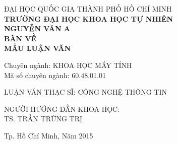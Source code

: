\vspace{-0.75cm}
\begin{center}
\begingroup \fontsize{14pt}{0pt}\selectfont ĐẠI HỌC QUỐC GIA THÀNH PHỐ HỒ CHÍ MINH\endgroup\\
\textbf{\begingroup \fontsize{14pt}{21pt}\selectfont TRƯỜNG ĐẠI HỌC KHOA HỌC TỰ NHIÊN \endgroup}\\
\vspace{2.25cm}
\textbf{\begingroup \fontsize{14pt}{21pt}\selectfont NGUYỄN VĂN A\endgroup}\\
\vspace{2.5cm}
\renewcommand{\baselinestretch}{1.0}%
\textbf{\begingroup \fontsize{16pt}{24pt}\selectfont BÀN VỀ\\MẪU LUẬN VĂN\endgroup}\\
\renewcommand{\baselinestretch}{\spacing}%
\end{center}
\vspace{2.25cm}

\begingroup
Chuyên ngành: KHOA HỌC MÁY TÍNH\\
\forceindent Mã số chuyên ngành: 60.48.01.01\\
\vspace{0.5cm}
\endgroup

LUẬN VĂN THẠC SĨ: CÔNG NGHỆ THÔNG TIN\\
\vspace{0.75cm}

\begin{center}
NGƯỜI HƯỚNG DẪN KHOA HỌC:\\
TS. TRẦN TRỪNG TRỊ
\end{center}
\vspace{\fill}

\begin{center}
Tp. Hồ Chí Minh, Năm 2015
\end{center}
\newpage